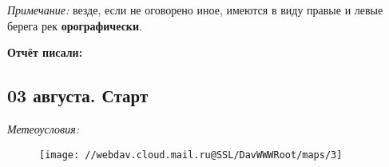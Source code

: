 \textit{Примечание:} везде, если не оговорено иное, имеются в виду правые и левые берега рек \textbf{орографически}.

\textbf{Отчёт писали:} 
\subsection{03 августа. Старт}
\textit{Метеоусловия: }

\begin{figure}[h!]
	\centering
	\texttt{[image: //webdav.cloud.mail.ru@SSL/DavWWWRoot/maps/3]}
	\label{fig:mini_18}
\end{figure}



\clearpage